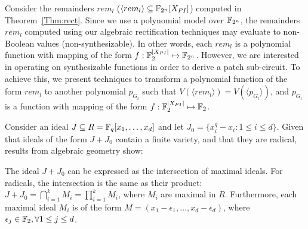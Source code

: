 
Consider the remainders $rem_l$ ($\langle rem_l \rangle \subseteq {\mathbb{F}}_{2^n}[X_{PI}] $) computed in Theorem~\ref{Thm:rect}. 
Since we use a polynomial model over ${\mathbb{F}}_{2^n}$, the remainders $rem_l$ computed using our algebraic rectification techniques 
may evaluate to non-Boolean values (non-synthesizable). In other words, each $rem_l$ is a 
polynomial function with mapping of the form $f:{\mathbb{F}}_2^{|X_{PI}|}\mapsto {\mathbb{F}}_{2^n}$. However, we are interested
in operating on synthesizable functions in order to derive a patch sub-circuit.
To achieve this, we present techniques to 
transform a polynomial function of the form $rem_l$ to another polynomial $p_{G_l}$ 
such that $V(\langle rem_l \rangle) = V(\langle p_{G_l} \rangle)$, and $p_{G_l}$ 
is a function with mapping of the form $f:{\mathbb{F}}_2^{|X_{PI}|}\mapsto {\mathbb{F}}_2$.

Consider an ideal $J\subseteq R = {\mathbb{F}}_{q}[x_1,\dots,x_d]$ and let $J_0 = \{x_i^q-x_i: 1\leq i \leq d\}$. 
Given that ideals of the form $J + J_0$ contain a finite variety, 
and that they are radical, results from algebraic geometry show: 

\begin{Fact}
The ideal $ J+ J_0$ can be expressed as the intersection of maximal ideals. For radicals, the intersection is the same as their product: $J+J_0 = \bigcap_{i=1}^{k}M_i = \prod_{i=1}^{k}M_i$, where $M_i$ are maximal in $R$. Furthermore, each maximal ideal $M_i$ is of the form $M = (x_1-\epsilon_1,\dots,x_d-\epsilon_d)$, where $\epsilon_j \in {\mathbb{F}}_2, \forall 1\leq j \leq d$.
\end{Fact}

